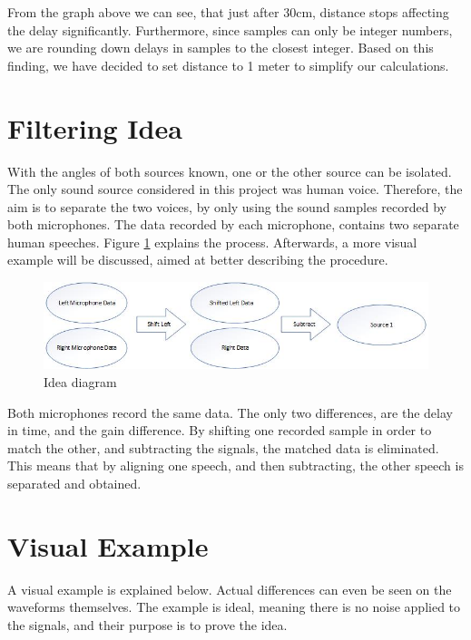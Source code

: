 From the graph above we can see, that just after 30cm, distance stops affecting the 
delay significantly. Furthermore, since samples can only be integer numbers, we are 
rounding down delays in samples to the closest integer. Based on this finding, we 
have decided to set distance to 1 meter to simplify our calculations.













\newpage
\section{Filtering Idea}
With the angles of both sources known, one or the other source can be isolated. The 
only sound source considered in this project was human voice. Therefore, the aim is 
to separate the two voices, by only using the sound samples recorded by both 
microphones. The data recorded by each microphone, contains two separate human 
speeches. Figure \ref{fig:IdeaDiagram} explains the process. Afterwards, a more 
visual example will be discussed, aimed at better describing the procedure. 

\begin{figure}[htp]
	\centering
	\includegraphics[width=1\textwidth]{Illustrations/IdeaDiagram.jpg}
	\caption{Idea diagram}
	\label{fig:IdeaDiagram}
\end{figure}

Both microphones record the same data. The only two differences, are the delay in 
time, and the gain difference. By shifting one recorded sample in order to match 
the other, and subtracting the signals, the matched data is eliminated. This means 
that by aligning one speech, and then subtracting, the other speech is separated 
and obtained.

\newpage

\section{Visual Example}
A visual example is explained below. Actual differences can even be seen on the 
waveforms themselves. The example is ideal, meaning there is no noise applied to 
the signals, and their purpose is to prove the idea.\\

